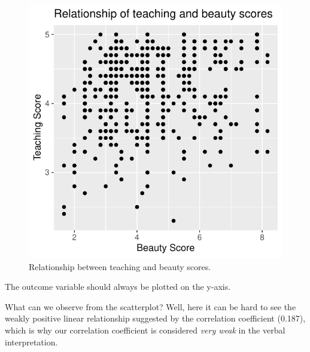 \documentclass[
  letterpaper,
  DIV=11,
  numbers=noendperiod]{scrartcl}
\begin{document}
\begin{figure}[H]

{\centering \includegraphics{index_files/figure-pdf/unnamed-chunk-4-1.pdf}

}

\caption{Relationship between teaching and beauty scores.}

\end{figure}%

\begin{tcolorbox}[enhanced jigsaw, left=2mm, coltitle=black, breakable, rightrule=.15mm, colbacktitle=quarto-callout-note-color!10!white, opacitybacktitle=0.6, bottomtitle=1mm, colback=white, toptitle=1mm, title=\textcolor{quarto-callout-note-color}{\faInfo}\hspace{0.5em}{Note}, titlerule=0mm, colframe=quarto-callout-note-color-frame, toprule=.15mm, arc=.35mm, opacityback=0, leftrule=.75mm, bottomrule=.15mm]

The outcome variable should always be plotted on the y-axis.

\end{tcolorbox}

What can we observe from the scatterplot? Well, here it can be hard to
see the weakly positive linear relationship suggested by the correlation
coefficient (0.187), which is why our correlation coefficient is
considered \emph{very weak} in the verbal interpretation.
\end{document}
